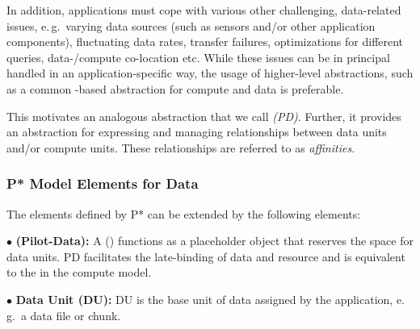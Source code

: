 \documentclass[conference]{IEEEtran}
\begin{document}
In addition, applications must cope with various other challenging,
data-related issues, e.\,g.\ varying data sources (such as sensors
and/or other application components), fluctuating data rates, transfer
failures, optimizations for different queries, data-/compute
co-location etc. While these issues can be in principal handled in an
application-specific way, the usage of higher-level abstractions, such
as a common \pilot-based abstraction for compute and data is
preferable.  


This motivates an analogous abstraction that we call \emph{\pilotdata
  (PD)}.  Further, it provides an abstraction for expressing and
managing relationships between data units and/or compute units. These
relationships are referred to as \emph{affinities}.


\subsubsection*{P* Model Elements for Data}


The elements defined by P* can be extended by the following elements:


\noindent$\bullet$
  \textbf{\pilot (Pilot-Data):} A \pilotdata (\pd) functions as a 
	placeholder object that reserves the space
	for data units. PD facilitates the late-binding of data and resource and is
	equivalent to the \pilot in the compute model.

\noindent$\bullet$
  \textbf{Data Unit (DU):} DU is the base unit of data assigned by
  the application,  e.\,g.\ a data file or chunk. 


\end{document}
